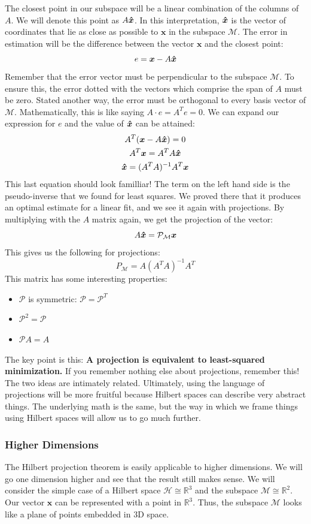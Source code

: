 The closest point in our subspace will be a linear combination of the columns of $A$. We will denote this point as $A\bm{\hat{x}}$. In this interpretation, $\bm{\hat{x}}$ is the vector of coordinates that lie as close as possible to $\bm{x}$ in the subspace $\mathcal{M}$. The error in estimation will be the difference between the vector $\bm{x}$ and the closest point:
$$e=\bm{x}-A\bm{\hat{x}}$$
Remember that the error vector must be perpendicular to the subspace $\mathcal{M}$. To ensure this, the error dotted with the vectors which comprise the span of $A$ must be zero. Stated another way, the error must be orthogonal to every basis vector of $\mathcal{M}$. Mathematically, this is like saying $A\cdot e=A^Te=0$. We can expand our expression for $e$ and the value of $\bm{\hat{x}}$ can be attained:
\begin{gather}
A^T(\bm{x}-A\bm{\hat{x}})=0\\
A^T\bm{x} =A^TA\bm{\hat{x}}\\
\bm{\hat{x}}=(A^TA)^{-1}A^T\bm{x}
\end{gather}
This last equation should look familliar! The term on the left hand side is the pseudo-inverse that we found for least squares. We proved there that it produces an optimal estimate for a linear fit, and we see it again with projections. By multiplying with the $A$ matrix again, we get the projection of the vector:
$$A\bm{\hat{x}}=\mathcal{P}_\mathcal{M}\bm{x}$$
This gives us the following for projections:
$$P_{\mathcal{M}}=A(A^TA)^{-1}A^T$$
This matrix has some interesting properties:
\begin{itemize}
    \item $\mathcal{P}$ is symmetric: $\mathcal{P}=\mathcal{P}^T$
    \item $\mathcal{P}^2=\mathcal{P}$
    \item $\mathcal{P}A=A$
\end{itemize}

The key point is this: \textbf{A projection is equivalent to least-squared minimization.} If you remember nothing else about projections, remember this! The two ideas are intimately related. Ultimately, using the language of projections will be more fruitful because Hilbert spaces can describe very abstract things. The underlying math is the same, but the way in which we frame things using Hilbert spaces will allow us to go much further.

\subsubsection{Higher Dimensions}
The Hilbert projection theorem is easily applicable to higher dimensions. We will go one dimension higher and see that the result still makes sense. We will consider the simple case of a Hilbert space  $\mathcal{H}\cong\mathbb{R}^3$ and the subspace $\mathcal{M}\cong\mathbb{R}^2$. Our vector $\bm{x}$ can be represented with a point in $\mathbb{R}^3$. Thus, the subspace $\mathcal{M}$ looks like a plane of points embedded in 3D space. 

